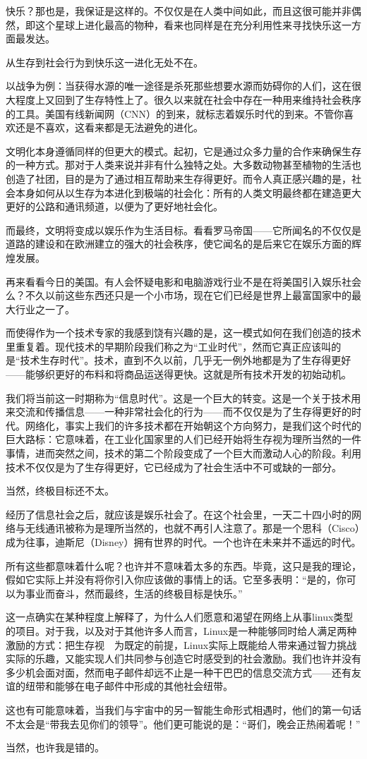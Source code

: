 快乐？那也是，我保证是这样的。不仅仅是在人类中间如此，而且这很可能并非偶然，即这个星球上进化最高的物种，看来也同样是在充分利用性来寻找快乐这一方面最发达。

从生存到社会行为到快乐这一进化无处不在。

以战争为例：当获得水源的唯一途径是杀死那些想要水源而妨碍你的人们，这在很大程度上又回到了生存特性上了。很久以来就在社会中存在一种用来维持社会秩序的工具。美国有线新闻网（CNN）的到来，就标志着娱乐时代的到来。不管你喜欢还是不喜欢，这看来都是无法避免的进化。

文明化本身遵循同样的但更大的模式。起初，它是通过众多力量的合作来确保生存的一种方式。那对于人类来说并非有什么独特之处。大多数动物甚至植物的生活也创造了社团，目的是为了通过相互帮助来生存得更好。而令人真正感兴趣的是，社会本身如何从以生存为本进化到极端的社会化：所有的人类文明最终都在建造更大更好的公路和通讯频道，以便为了更好地社会化。

而最终，文明将变成以娱乐作为生活目标。看看罗马帝国——它所闻名的不仅仅是道路的建设和在欧洲建立的强大的社会秩序，使它闻名的是后来它在娱乐方面的辉煌发展。

再来看看今日的美国。有人会怀疑电影和电脑游戏行业不是在将美国引入娱乐社会么？不久以前这些东西还只是一个小市场，现在它们已经是世界上最富国家中的最大行业之一了。

而使得作为一个技术专家的我感到饶有兴趣的是，这一模式如何在我们创造的技术里重复着。现代技术的早期阶段我们称之为“工业时代”，然而它真正应该叫的是“技术生存时代”。技术，直到不久以前，几乎无一例外地都是为了生存得更好——能够织更好的布料和将商品运送得更快。这就是所有技术开发的初始动机。

我们将当前这一时期称为“信息时代”。这是一个巨大的转变。这是一个关于技术用来交流和传播信息——一种非常社会化的行为——而不仅仅是为了生存得更好的时代。网络化，事实上我们的许多技术都在开始朝这个方向努力，是我们这个时代的巨大路标：它意味着，在工业化国家里的人们已经开始将生存视为理所当然的一件事情，进而突然之间，技术的第二个阶段变成了一个巨大而激动人心的阶段。利用技术不仅仅是为了生存得更好，它已经成为了社会生活中不可或缺的一部分。

当然，终极目标还不太。

经历了信息社会之后，就应该是娱乐社会了。在这个社会里，一天二十四小时的网络与无线通讯被称为是理所当然的，也就不再引人注意了。那是一个思科（Cisco）成为往事，迪斯尼（Disney）拥有世界的时代。一个也许在未来并不遥远的时代。

所有这些都意味着什么呢？也许并不意味着太多的东西。毕竟，这只是我的理论，假如它实际上并没有将你引入你应该做的事情上的话。它至多表明：“是的，你可以为事业而奋斗，然而最终，生活的终极目标是快乐。”

这一点确实在某种程度上解释了，为什么人们愿意和渴望在网络上从事linux类型的项目。对于我，以及对于其他许多人而言，Linux是一种能够同时给人满足两种激励的方式：把生存视　为既定的前提，Linux实际上既能给人带来通过智力挑战实际的乐趣，又能实现人们共同参与创造它时感受到的社会激励。我们也许并没有多少机会面对面，然而电子邮件却远不止是一种干巴巴的信息交流方式——还有友谊的纽带和能够在电子邮件中形成的其他社会纽带。

这也有可能意味着，当我们与宇宙中的另一智能生命形式相遇时，他们的第一句话不太会是“带我去见你们的领导”。他们更可能说的是：“哥们，晚会正热闹着呢！”

当然，也许我是错的。

 
